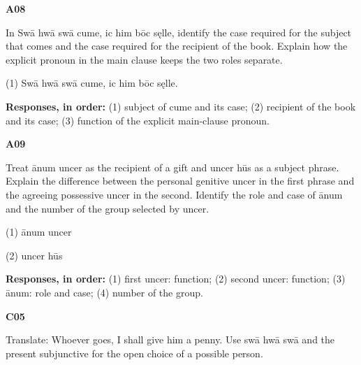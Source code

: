 \par\begin{minipage}{\linewidth}\raggedright
\textbf{A08}

In Swā hwā swā cume, ic him bōc sęlle, identify the case required for the subject that comes and the case required for the recipient of the book. Explain how the explicit pronoun in the main clause keeps the two roles separate.

(1) Swā hwā swā cume, ic him bōc sęlle.

\textbf{Responses, in order:} (1) subject of cume and its case; (2) recipient of the book and its case; (3) function of the explicit main-clause pronoun.

\end{minipage}\par\addvspace{4pt}

\par\begin{minipage}{\linewidth}\raggedright
\textbf{A09}

Treat ānum uncer as the recipient of a gift and uncer hūs as a subject phrase. Explain the difference between the personal genitive uncer in the first phrase and the agreeing possessive uncer in the second. Identify the role and case of ānum and the number of the group selected by uncer.

(1) ānum uncer

(2) uncer hūs

\textbf{Responses, in order:} (1) first uncer: function; (2) second uncer: function; (3) ānum: role and case; (4) number of the group.

\end{minipage}\par\addvspace{4pt}

\par\begin{minipage}{\linewidth}\raggedright
\textbf{C05}

Translate: Whoever goes, I shall give him a penny. Use swā hwā swā and the present subjunctive for the open choice of a possible person.

\end{minipage}\par\addvspace{4pt}

